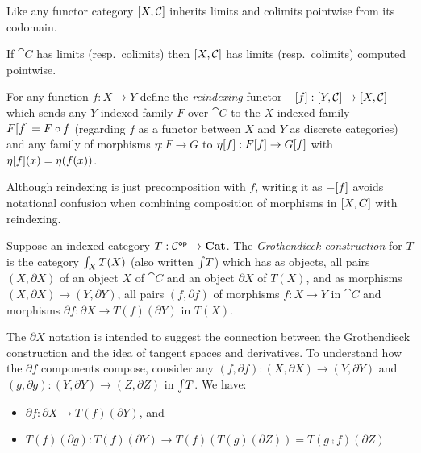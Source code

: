 Like any functor category $[X,\mathcal{C}]$ inherits limits and colimits pointwise from its codomain.

\begin{proposition}
If $\cat{C}$ has limits (resp.~colimits) then $[X,\mathcal{C}]$ has limits (resp.~colimits) computed
pointwise.
\end{proposition}

\begin{definition}[Reindexing]
For any function $f: X \to Y$ define the \emph{reindexing} functor $-[f]: [Y,\mathcal{C}] \to
[X,\mathcal{C}]$ which sends any $Y$-indexed family $F$ over $\cat{C}$ to the $X$-indexed family
$F[f] = F \circ f$ (regarding $f$ as a functor between $X$ and $Y$ as discrete categories) and any
family of morphisms $\eta: F \to G$ to $\eta[f]: F[f] \to G[f]$ with
$\eta[f](x) = \eta(f(x))$.
\end{definition}

Although reindexing is just precomposition with $f$, writing it as $-[f]$ avoids notational
confusion when combining composition of morphisms in $[X,C]$ with reindexing.

\begin{definition}
\label{def:Grothendieck}
 Suppose an indexed category $T: \mathcal{C}^{\mathsf{op}} \to
\mathbf{Cat}$. The \emph{Grothendieck construction} for $T$ is the category $\int_{X}T(X)$ (also written
$\int_{}T$) which has as objects, all pairs $(X, \partial X)$ of an object $X$ of $\cat{C}$ and an
object $\partial X$ of $T(X)$, and as morphisms $(X, \partial X) \to (Y, \partial Y)$, all pairs $(f, \partial
f)$ of morphisms $f: X \to Y$ in $\cat{C}$ and morphisms $\partial f: \partial X \to T(f)(\partial Y)$ in
$T(X)$.
\end{definition}

\noindent The $\partial X$ notation is intended to suggest the connection between the Grothendieck
construction and the idea of tangent spaces and derivatives. To understand how the $\partial f$ components
compose, consider any $(f, \partial f): (X, \partial X) \to (Y, \partial Y)$ and $(g, \partial g): (Y,
\partial Y) \to (Z, \partial Z)$ in $\int_{}T$. We have:

\begin{itemize}
\item $\partial f: \partial X \to T(f)(\partial Y)$, and
\item $T(f)(\partial g): T(f)(\partial Y) \to T(f)(T(g)(\partial Z)) = T(g \comp f)(\partial Z)$
\end{itemize}

